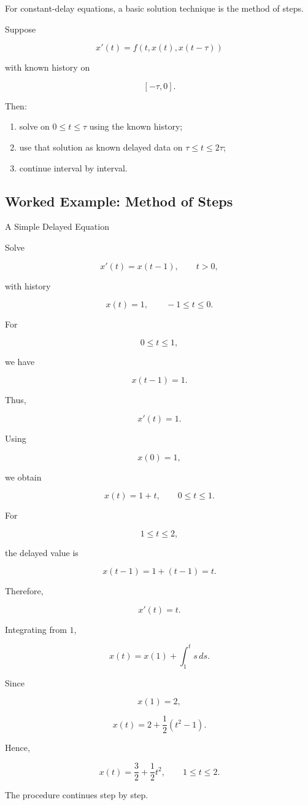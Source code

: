 For constant-delay equations, a basic solution technique is the method of
steps.

Suppose

\[
x'(t)
=
f
\left(
t,
x(t),
x(t-\tau)
\right)
\]

with known history on

\[
[-\tau,0].
\]

Then:

\begin{enumerate}
    \item solve on \(0\leq t\leq\tau\) using the known history;
    \item use that solution as known delayed data on
          \(\tau\leq t\leq2\tau\);
    \item continue interval by interval.
\end{enumerate}

\subsection{Worked Example: Method of Steps}
\label{subsec:worked-method-of-steps}

\begin{workedexamplebox}{A Simple Delayed Equation}

Solve

\[
x'(t)=x(t-1),
\qquad
t>0,
\]

with history

\[
x(t)=1,
\qquad
-1\leq t\leq0.
\]

For

\[
0\leq t\leq1,
\]

we have

\[
x(t-1)=1.
\]

Thus,

\[
x'(t)=1.
\]

Using

\[
x(0)=1,
\]

we obtain

\[
\boxed{
x(t)=1+t,
\qquad
0\leq t\leq1.
}
\]

For

\[
1\leq t\leq2,
\]

the delayed value is

\[
x(t-1)
=
1+(t-1)
=
t.
\]

Therefore,

\[
x'(t)=t.
\]

Integrating from \(1\),

\[
x(t)
=
x(1)
+
\int_1^t s\,ds.
\]

Since

\[
x(1)=2,
\]

\[
x(t)
=
2
+
\frac12(t^2-1).
\]

Hence,

\begin{answerbox}
\[
\boxed{
x(t)
=
\frac32
+
\frac12t^2,
\qquad
1\leq t\leq2.
}
\]
\end{answerbox}

The procedure continues step by step.

\end{workedexamplebox}

